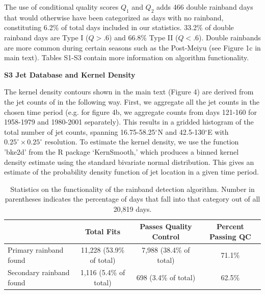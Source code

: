 \documentclass[final,grl]{agutexSI}
\begin{document}
\begin{article}
\vspace{1mm}

	The use of conditional quality scores $Q_1$ and $Q_2$ adds 466 double rainband days that would otherwise have been categorized as days with no rainband, constituting 6.2\% of total days included in our statistics. 33.2\% of double rainband days are Type I ($Q>.6$) and 66.8\% Type II ($Q<.6$). Double rainbands are more common during certain seasons such as the Post-Meiyu (see Figure 1c in main text). Tables S1-S3 contain more information on algorithm functionality.
	
\vspace{5mm}


\noindent\textbf{{\Large S3 Jet Database and Kernel Density}}

\vspace{2mm}

The kernel density contours shown in the main text (Figure 4) are derived from the jet counts of \citet{Schiemann2009} in the following way. First, we aggregate all the jet counts in the chosen time period (e.g. for figure 4b, we aggregate counts from days 121-160 for 1958-1979 and 1980-2001 separately). This results in a gridded histogram of the total number of jet counts, spanning 16.75-58.25$^{\circ}$N and 42.5-130$^{\circ}$E with $0.25^{\circ} \times 0.25^{\circ}$ resolution. To estimate the kernel density, we use the function 'bke2d' from the R package `KernSmooth,' which produces a binned kernel density estimate using the standard bivariate normal distribution. This gives an estimate of the probability density function of jet location in a given time period. 



%
%


\end{article}

\clearpage


\begin{table}

\caption{Statistics on the functionality of the rainband detection algorithm. Number in parentheses indicates the percentage of days that fall into that category out of all 20,819 days.}
\centering

\begin{tabular}{ l c c c}
	  & Total Fits & Passes Quality Control & Percent Passing QC\\
	 \hline
	 Primary rainband found & 11,228 (53.9\% of total) & 7,988 (38.4\% of total) & 71.1\% \\
	 Secondary rainband found & 1,116 (5.4\% of total) & 698 (3.4\% of total) & 62.5\% \\
\end{tabular}
\label{ts1}
\end{table}
\end{document}
